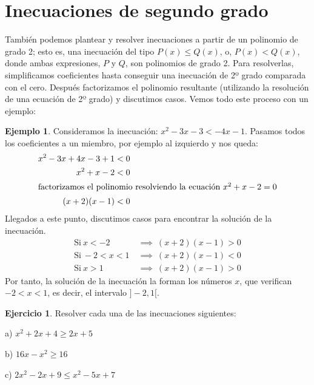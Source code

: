 \documentclass[13pt]{scrartcl}
\theoremstyle{definition}
\newtheorem{ejemplo}{Ejemplo}
\newtheorem{ejercicio}{Ejercicio}
\begin{document}
\section{Inecuaciones de segundo grado}

También podemos plantear y resolver inecuaciones a partir de un polinomio de grado 2; esto 
es, una inecuación del tipo $P(x) \le Q(x)$, o, $P(x) <Q(x)$, donde ambas expresiones, $P$ 
y $Q$, son polinomios de grado 2. Para resolverlas, simplificamos coeficientes hasta conseguir 
una inecuación de 2º grado comparada con el cero. Después factorizamos el polinomio 
resultante (utilizando la resolución de una ecuación de 2º grado) y discutimos casos. Vemos 
todo este proceso con un ejemplo:

\pagebreak[4]

\begin{ejemplo} Consideramos la inecuación: $x^2-3x-3<-4x-1$. Pasamos todos los 
coeficientes a un miembro, por ejemplo al izquierdo y nos queda:
\begin{align*}
x^2-3x+4x-3+1 & <0 \\
x^2+x-2&<0 \\
\intertext{factorizamos el polinomio resolviendo la ecuación $x^2+x-2=0$}
(x+2)(x-1) &<0
\end{align*}
Llegados a este punto, discutimos casos para encontrar la solución de la inecuación.
\begin{align*}
\text{Si} \ x < -2 & \ \implies \ (x+2)(x-1)>0 \\
\text{Si} \ -2 < x <1 & \ \implies \ (x+2)(x-1)<0 \\
\text{Si} \ x > 1 & \ \implies \ (x+2)(x-1)>0 
\end{align*}
Por tanto, la solución de la inecuación la forman los números $x$, que verifican $-2<x<1$, es decir, el intervalo $]-2,1[$.
\end{ejemplo}

\pagebreak[4]

\begin{ejercicio} Resolver cada una de las inecuaciones siguientes:
\begin{multicols}{3}
\item[a)] $x^2+2x+4\ge 2x+5$
\item[b)] $16x-x^2\ge16 $
\item[c)] $2x^2-2x+9\le x^2-5x+7$
\end{multicols}
\end{ejercicio}
\end{document}
